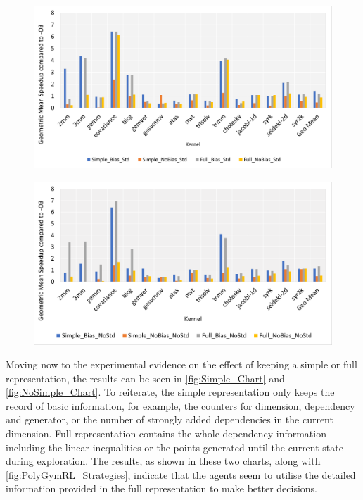 \documentclass[logo,msc]{infthesis}           %
\begin{document}
\begin{figure}
\centering
\begin{minipage}{.45\linewidth}
  \includegraphics[width=\linewidth]{Images/Std_Chart.png}
  \label{fig:Std_Chart}
\end{minipage}
\hspace{.05\linewidth}
\begin{minipage}{.45\linewidth}
  \includegraphics[width=\linewidth]{Images/NoStd_Chart.png}
  \label{fig:NoStd_Chart}
\end{minipage}
\end{figure}

Moving now to the experimental evidence on the effect of keeping a simple or full representation, the results can be seen in \ref{fig:Simple_Chart} and \ref{fig:NoSimple_Chart}. To reiterate, the simple representation only keeps the record of basic information, for example, the counters for dimension, dependency and generator, or the number of strongly added dependencies in the current dimension. Full representation contains the whole dependency information including the linear inequalities or the points generated until the current state during exploration. The results, as shown in these two charts, along with \ref{fig:PolyGymRL_Strategies}, indicate that the agents seem to utilise the detailed information provided in the full representation to make better decisions. 
\end{document}
